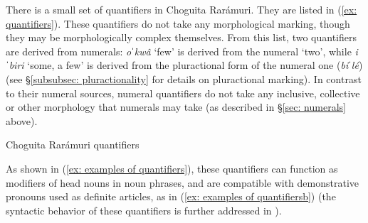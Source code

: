 There is a small set of quantifiers in Choguita Rarámuri. They are listed in (\ref{ex: quantifiers}). These quantifiers do not take any morphological marking, though they may be morphologically complex themselves. From this list, two quantifiers are derived from numerals: \textit{oˈkwâ} `few' is derived from the numeral `two', while \textit{iˈbiri} `some, a few' is derived from the pluractional form of the numeral one (\textit{biˈlé}) (see §\ref{subsubsec: pluractionality} for details on pluractional marking). In contrast to their numeral sources, numeral quantifiers do not take any inclusive, collective or other morphology that numerals may take (as described in §\ref{sec: numerals} above).

\ea\label{ex: quantifiers}
{Choguita Rarámuri quantifiers}

    \z
\z

As shown in (\ref{ex: examples of quantifiers}), these quantifiers can function as modifiers of head nouns in noun phrases, and are compatible with demonstrative pronouns used as definite articles, as in (\ref{ex: examples of quantifiersb}) (the syntactic behavior of these quantifiers is further addressed in ).

\ea\label{ex: examples of quantifiers}

